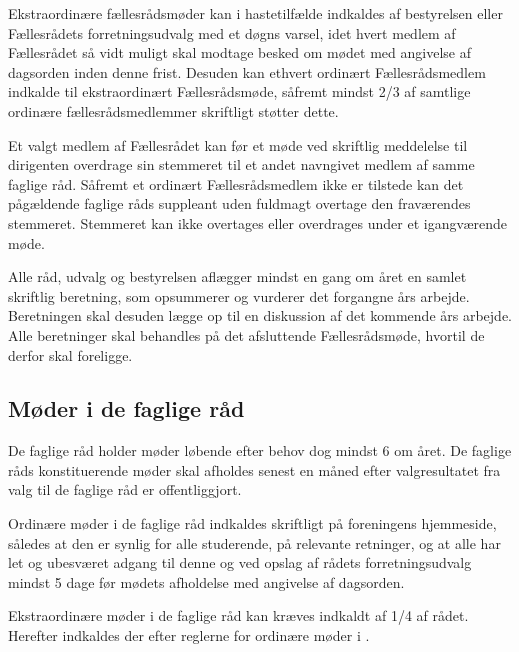 \begin{list}
\begin{list}
\item \label{S:FRmoeder:ekstra} Ekstraordinære fællesrådsmøder kan i hastetilfælde indkaldes af bestyrelsen eller Fællesrådets forretningsudvalg med et døgns varsel, idet hvert medlem af Fællesrådet så vidt muligt skal modtage besked om mødet med angivelse af dagsorden inden denne frist. Desuden kan ethvert ordinært Fællesrådsmedlem indkalde til ekstraordinært Fællesrådsmøde, såfremt mindst 2/3 af samtlige ordinære fællesrådsmedlemmer skriftligt støtter dette.

\item  Et valgt medlem af Fællesrådet kan før et møde ved skriftlig meddelelse til dirigenten overdrage sin stemmeret til et andet navngivet medlem af samme faglige råd. Såfremt et ordinært Fællesrådsmedlem ikke er tilstede kan det pågældende faglige råds suppleant uden fuldmagt overtage den fraværendes stemmeret. Stemmeret kan ikke overtages eller overdrages under et igangværende møde.

\item  Alle råd, udvalg og bestyrelsen aflægger mindst en gang om året en samlet skriftlig beretning, som opsummerer og vurderer det forgangne års arbejde. Beretningen skal desuden lægge op til en diskussion af det kommende års arbejde. Alle beretninger skal behandles på det afsluttende Fællesrådsmøde, hvortil de derfor skal foreligge.


\subsection{Møder i de faglige råd}
\label{S:kap:FagligMoeder}
\item De faglige råd holder møder løbende efter behov dog mindst 6 om året. De faglige råds konstituerende møder skal afholdes senest en måned efter valgresultatet fra valg til de faglige råd er offentliggjort.

\item  \label{S:FagligMoeder:indkaldelse} Ordinære møder i de faglige råd indkaldes skriftligt på foreningens hjemmeside, således at den er synlig for alle studerende, på relevante retninger, og at alle har let og ubesværet adgang til denne og ved opslag af rådets forretningsudvalg mindst 5 dage før mødets afholdelse med angivelse af dagsorden. 

\item  Ekstraordinære møder i de faglige råd kan kræves indkaldt af 1/4 af rådet. Herefter indkaldes der efter reglerne for ordinære møder i .


\end{list}
\end{list}

